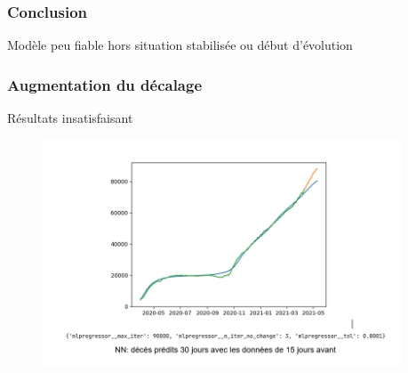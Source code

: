 \documentclass{beamer}
\begin{document}
\begin{frame}
	\frametitle{Conclusion}
	Modèle peu fiable hors situation stabilisée ou début d'évolution
\end{frame}

\appendix

\begin{frame}
	\frametitle{Augmentation du décalage}
	Résultats insatisfaisant
	\begin{figure}
		\includegraphics[width=0.95\textwidth]{NN_2}
	\end{figure}
\end{frame}
\end{document}
